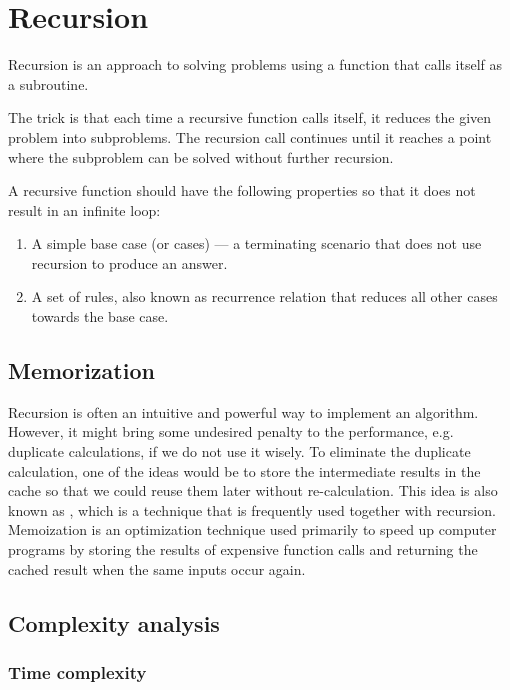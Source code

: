 \chapter{Recursion}

Recursion is an approach to solving problems using a function that calls itself as a subroutine.

The trick is that each time a recursive function calls itself, it reduces the given problem into subproblems.
The recursion call continues until it reaches a point where the subproblem can be solved without further recursion.

A recursive function should have the following properties so that it does not result in an infinite loop:
\begin{enumerate}
\item A simple base case (or cases) — a terminating scenario that does not use recursion to produce an answer.
\item A set of rules, also known as recurrence relation that reduces all other cases towards the base case.
\end{enumerate}


\section{Memorization}


Recursion is often an intuitive and powerful way to implement an algorithm.
However, it might bring some undesired penalty to the performance, e.g. duplicate calculations, if we do not use it wisely.
To eliminate the duplicate calculation, one of the ideas would be to store the intermediate results in the cache so that we could reuse them later without re-calculation.
This idea is also known as , which is a technique that is frequently used together with recursion.
Memoization is an optimization technique used primarily to speed up computer programs by storing the results of expensive function calls and returning the cached result when the same inputs occur again. 


\section{Complexity analysis}

\subsection{Time complexity}

